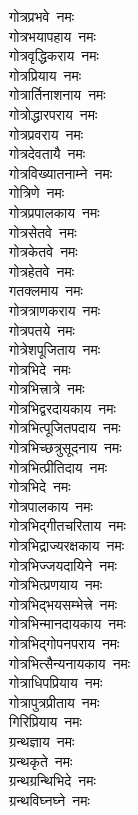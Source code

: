 \begin{multicols}{2}
\begin{flushleft}
गोत्रप्रभवे~नमः\\
गोत्रभयापहाय~नमः\\
गोत्रवृद्धिकराय~नमः\hfill{}\\
गोत्रप्रियाय~नमः\\
गोत्रार्तिनाशनाय~नमः\\
गोत्रोद्धारपराय~नमः\\
गोत्रप्रवराय~नमः\\
गोत्रदेवतायै~नमः\\
गोत्रविख्यातनाम्ने~नमः\\
गोत्रिणे~नमः\\
गोत्रप्रपालकाय~नमः\\
गोत्रसेतवे~नमः\\
गोत्रकेतवे~नमः\hfill{}\\
गोत्रहेतवे~नमः\\
गतक्लमाय~नमः\\
गोत्रत्राणकराय~नमः\\
गोत्रपतये~नमः\\
गोत्रेशपूजिताय~नमः\\
गोत्रभिदे~नमः\\
गोत्रभित्त्रात्रे~नमः\\
गोत्रभिद्वरदायकाय~नमः\\
गोत्रभित्पूजितपदाय~नमः\\
गोत्रभिच्छत्रुसूदनाय~नमः\hfill{}\\
गोत्रभित्प्रीतिदाय~नमः\\
गोत्रभिदे~नमः\\
गोत्रपालकाय~नमः\\
गोत्रभिद्गीतचरिताय~नमः\\
गोत्रभिद्राज्यरक्षकाय~नमः\\
गोत्रभिज्जयदायिने~नमः\\
गोत्रभित्प्रणयाय~नमः\\
गोत्रभिद्भयसम्भेत्त्रे~नमः\\
गोत्रभिन्मानदायकाय~नमः\\
गोत्रभिद्गोपनपराय~नमः\hfill{}\\
गोत्रभित्सैन्यनायकाय~नमः\\
गोत्राधिपप्रियाय~नमः\\
गोत्रापुत्रप्रीताय~नमः\\
गिरिप्रियाय~नमः\\
ग्रन्थज्ञाय~नमः\\
ग्रन्थकृते~नमः\\
ग्रन्थग्रन्थिभिदे~नमः\\
ग्रन्थविघ्नघ्ने~नमः\\

\end{flushleft}
\end{multicols}
